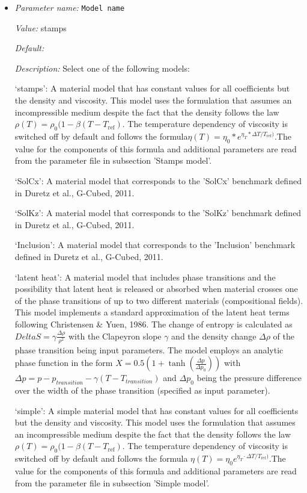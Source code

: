 \begin{itemize}
\item {\it Parameter name:} {\tt Model name}


{\it Value:} stamps


{\it Default:} 


{\it Description:} Select one of the following models:

`stamps': A material model that has constant values for all coefficients but the density and viscosity. This model uses the formulation that assumes an incompressible medium despite the fact that the density follows the law $\rho(T)=\rho_0(1-\beta(T-T_{\text{ref}})$. The temperature dependency of viscosity is  switched off by default and follows the formula$\eta(T)=\eta_0*e^{\eta_T*\Delta T / T_{\text{ref}})}$.The value for the components of this formula and additional parameters are read from the parameter file in subsection 'Stamps model'.

`SolCx': A material model that corresponds to the 'SolCx' benchmark defined in Duretz et al., G-Cubed, 2011.

`SolKz': A material model that corresponds to the 'SolKz' benchmark defined in Duretz et al., G-Cubed, 2011.

`Inclusion': A material model that corresponds to the 'Inclusion' benchmark defined in Duretz et al., G-Cubed, 2011.

`latent heat': A material model that includes phase transitions and the possibility that latent heat is released or absorbed when material crosses one of the phase transitions of up to two different materials (compositional fields). This model implements a standard approximation of the latent heat terms following Christensen \& Yuen, 1986. The change of entropy is calculated as $Delta S = \gamma \frac{\Delta\rho}{\rho^2}$ with the Clapeyron slope $\gamma$ and the density change $\Delta\rho$ of the phase transition being input parameters. The model employs an analytic phase function in the form $X=0.5 \left( 1 + \tanh \left( \frac{\Delta p}{\Delta p_0} \right) \right)$ with $\Delta p = p - p_{transition} - \gamma \left( T - T_{transition} \right)$ and $\Delta p_0$ being the pressure difference over the width of the phase transition (specified as input parameter).

`simple': A simple material model that has constant values for all coefficients but the density and viscosity. This model uses the formulation that assumes an incompressible medium despite the fact that the density follows the law $\rho(T)=\rho_0(1-\beta(T-T_{\text{ref}})$. The temperature dependency of viscosity is  switched off by default and follows the formula $\eta(T)=\eta_0 e^{\eta_T \cdot \Delta T / T_{\text{ref}})}$.The value for the components of this formula and additional parameters are read from the parameter file in subsection 'Simple model'.


\end{itemize}
